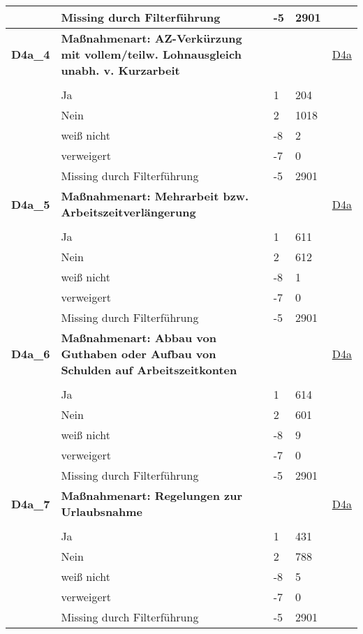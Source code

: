 \begin{longtable}{| L{2.5cm} | L{8.25cm}| C{1.5cm} | R{1.25cm} | C{2.25cm} |  }
   & Missing durch Filterführung & -5 & 2901 &  \\ 
   \midrule
\textbf{D4a\_4}\label{var:suf:D4a:4} & \textbf{Maßnahmenart: AZ-Verkürzung mit vollem/teilw. Lohnausgleich unabh. v. Kurzarbeit} &  &  & \hyperref[D4a]{D4a} \\ 
   &  &  &  &  \\ 
   & Ja & 1 & 204 &  \\ 
   & Nein & 2 & 1018 &  \\ 
   & weiß nicht & -8 & 2 &  \\ 
   & verweigert & -7 & 0 &  \\ 
   & Missing durch Filterführung & -5 & 2901 &  \\ 
   \midrule
\textbf{D4a\_5}\label{var:suf:D4a:5} & \textbf{Maßnahmenart: Mehrarbeit bzw. Arbeitszeitverlängerung} &  &  & \hyperref[D4a]{D4a} \\ 
   &  &  &  &  \\ 
   & Ja & 1 & 611 &  \\ 
   & Nein & 2 & 612 &  \\ 
   & weiß nicht & -8 & 1 &  \\ 
   & verweigert & -7 & 0 &  \\ 
   & Missing durch Filterführung & -5 & 2901 &  \\ 
   \midrule
\textbf{D4a\_6}\label{var:suf:D4a:6} & \textbf{Maßnahmenart: Abbau von Guthaben oder Aufbau von Schulden auf Arbeitszeitkonten} &  &  & \hyperref[D4a]{D4a} \\ 
   &  &  &  &  \\ 
   & Ja & 1 & 614 &  \\ 
   & Nein & 2 & 601 &  \\ 
   & weiß nicht & -8 & 9 &  \\ 
   & verweigert & -7 & 0 &  \\ 
   & Missing durch Filterführung & -5 & 2901 &  \\ 
   \midrule
\textbf{D4a\_7}\label{var:suf:D4a:7} & \textbf{Maßnahmenart: Regelungen zur Urlaubsnahme} &  &  & \hyperref[D4a]{D4a} \\ 
   &  &  &  &  \\ 
   & Ja & 1 & 431 &  \\ 
   & Nein & 2 & 788 &  \\ 
   & weiß nicht & -8 & 5 &  \\ 
   & verweigert & -7 & 0 &  \\ 
   & Missing durch Filterführung & -5 & 2901 &  \\ 

\end{longtable}
